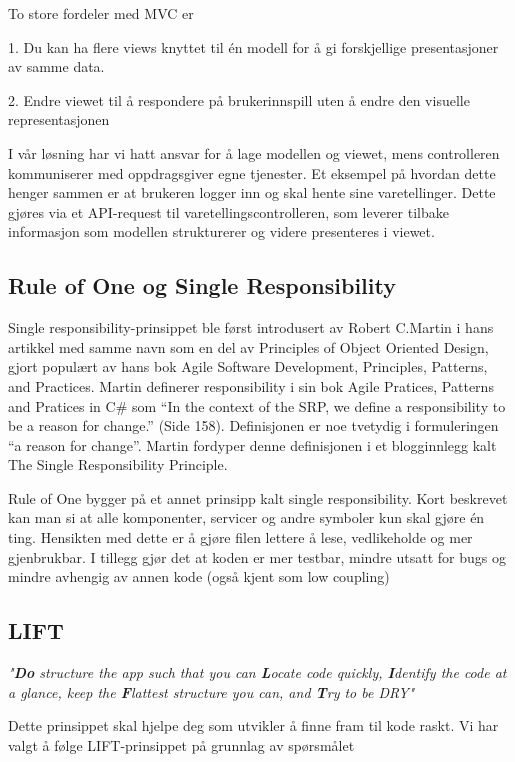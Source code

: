 To store fordeler med MVC er

1. Du kan ha flere views knyttet til én modell for å gi forskjellige presentasjoner av samme data.

2. Endre viewet til å respondere på brukerinnspill uten å endre den visuelle representasjonen

 I vår løsning har vi hatt ansvar for å lage modellen og viewet, mens controlleren kommuniserer med oppdragsgiver egne tjenester. Et eksempel på hvordan dette henger sammen er at brukeren logger inn og skal hente sine varetellinger. Dette gjøres via et API-request til varetellingscontrolleren, som leverer tilbake informasjon som modellen strukturerer og videre presenteres i viewet. 

\subsection{\textbf{Rule of One og Single Responsibility}}
Single responsibility-prinsippet ble først introdusert av Robert C.Martin i hans artikkel med samme navn som en del av Principles of Object Oriented Design, gjort populært av hans bok Agile Software Development, Principles, Patterns, and Practices. Martin definerer responsibility i sin bok Agile Pratices, Patterns and Pratices in C\# som “In the context of the SRP, we define a responsibility to be a reason for change.” (Side 158). Definisjonen er noe tvetydig i formuleringen “a reason for change”. Martin fordyper denne definisjonen i et blogginnlegg kalt The Single Responsibility Principle.  

Rule of One bygger på et annet prinsipp kalt single responsibility. Kort beskrevet kan man si at alle komponenter, servicer og andre symboler kun skal gjøre én ting. Hensikten med dette er å gjøre filen lettere å lese, vedlikeholde og mer gjenbrukbar. I tillegg gjør det at koden er mer testbar, mindre utsatt for bugs og mindre avhengig av annen kode (også kjent som low coupling)

\subsection{\textbf{LIFT}}

\textit{"\textbf{Do} structure the app such that you can \textbf{L}ocate code quickly, \textbf{I}dentify the code at a glance, keep the \textbf{F}lattest structure you can, and \textbf{T}ry to be DRY"} 

Dette prinsippet skal hjelpe deg som utvikler å finne fram til kode raskt. Vi har valgt å følge LIFT-prinsippet på grunnlag av spørsmålet

